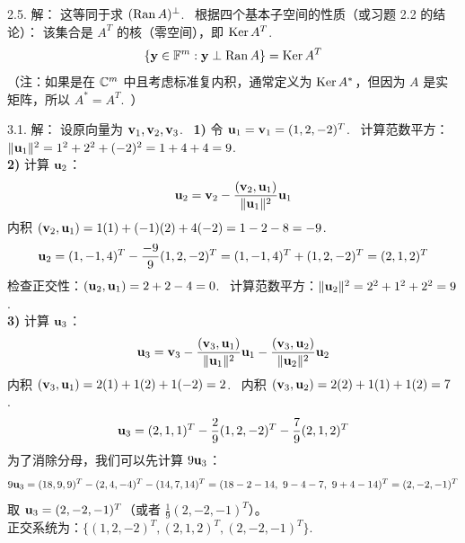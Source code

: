 \begin{exer}
2.5. 解：
这等同于求 $(\operatorname{Ran} A)^\perp$.~
根据四个基本子空间的性质（或习题 2.2 的结论）：
该集合是 $A^T$ 的核（零空间），即 $\operatorname{Ker} A^T$.~
$$ \{\mathbf{y} \in \mathbb{F}^m : \mathbf{y} \perp \operatorname{Ran} A\} = \operatorname{Ker} A^T $$
（注：如果是在 $\mathbb{C}^m$ 中且考虑标准复内积，通常定义为 $\operatorname{Ker} A^*$，但因为 $A$ 是实矩阵，所以 $A^* = A^T$.~）


\vspace{5ex}



3.1. 解：
设原向量为 $\mathbf{v}_1, \mathbf{v}_2, \mathbf{v}_3$.~
\textbf{1)} 令 $\mathbf{u}_1 = \mathbf{v}_1 = (1, 2, -2)^T$.~
计算范数平方：$\|\mathbf{u}_1\|^2 = 1^2 + 2^2 + (-2)^2 = 1 + 4 + 4 = 9$.~
\\
\textbf{2)} 计算 $\mathbf{u}_2$：
$$ \mathbf{u}_2 = \mathbf{v}_2 - \frac{(\mathbf{v}_2, \mathbf{u}_1)}{\|\mathbf{u}_1\|^2} \mathbf{u}_1 $$
内积 $(\mathbf{v}_2, \mathbf{u}_1) = 1(1) + (-1)(2) + 4(-2) = 1 - 2 - 8 = -9$.~
$$ \mathbf{u}_2 = (1, -1, 4)^T - \frac{-9}{9} (1, 2, -2)^T = (1, -1, 4)^T + (1, 2, -2)^T = (2, 1, 2)^T $$
检查正交性：$(\mathbf{u}_2, \mathbf{u}_1) = 2 + 2 - 4 = 0$.~
计算范数平方：$\|\mathbf{u}_2\|^2 = 2^2 + 1^2 + 2^2 = 9$.~
\\
\textbf{3)} 计算 $\mathbf{u}_3$：
$$ \mathbf{u}_3 = \mathbf{v}_3 - \frac{(\mathbf{v}_3, \mathbf{u}_1)}{\|\mathbf{u}_1\|^2} \mathbf{u}_1 - \frac{(\mathbf{v}_3, \mathbf{u}_2)}{\|\mathbf{u}_2\|^2} \mathbf{u}_2 $$
内积 $(\mathbf{v}_3, \mathbf{u}_1) = 2(1) + 1(2) + 1(-2) = 2$.~
内积 $(\mathbf{v}_3, \mathbf{u}_2) = 2(2) + 1(1) + 1(2) = 7$.~
$$ \mathbf{u}_3 = (2, 1, 1)^T - \frac{2}{9} (1, 2, -2)^T - \frac{7}{9} (2, 1, 2)^T $$
为了消除分母，我们可以先计算 $9\mathbf{u}_3$：
$$ 9\mathbf{u}_3 = (18, 9, 9)^T - (2, 4, -4)^T - (14, 7, 14)^T = (18-2-14, \ 9-4-7, \ 9+4-14)^T = (2, -2, -1)^T $$
取 $\mathbf{u}_3 = (2, -2, -1)^T$（或者 $\frac{1}{9}(2, -2, -1)^T$）。
\\
正交系统为：$\{(1, 2, -2)^T, (2, 1, 2)^T, (2, -2, -1)^T\}$.~


\end{exer}
